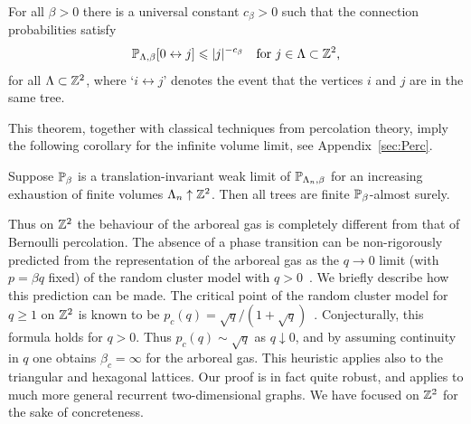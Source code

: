 \documentclass[11pt]{amsart}
\numberwithin{equation}{section}
\numberwithin{theorem}{section}
\begin{document}
\begin{theorem}
  \label{thm:Z2}
  For all $\beta>0$ there is a universal constant $c_\beta>0$ such that the
  connection probabilities satisfy
  \begin{equation}
    \label{eq:Z2}
    \P_{\Lambda,\beta}[0\leftrightarrow j] \leq |j|^{-c_\beta} \quad \text{for $j\in \Lambda \subset \Z^2$,}
  \end{equation}
  for all $\Lambda\subset\Z^2$, where
  `$i\leftrightarrow j$' denotes the event that the vertices $i$ and
  $j$ are in the same tree.
\end{theorem}

This theorem, together with classical techniques from percolation
theory, imply the following corollary for the infinite volume limit, see Appendix~\ref{sec:Perc}.
\begin{corollary}
  \label{cor:Z2}
  Suppose $\P_{\beta}$ is a translation-invariant weak limit of
  $\P_{\Lambda_{n},\beta}$ for an increasing exhaustion of finite volumes
  $\Lambda_{n}\uparrow \Z^{2}$. Then all trees are finite
  $\P_{\beta}$-almost surely.
\end{corollary}

Thus on $\Z^{2}$
the behaviour of the arboreal gas is completely different from that of
Bernoulli percolation. The absence of a phase transition can be
non-rigorously predicted from the representation of the arboreal gas
as the $q\to 0$ limit (with $p=\beta q$ fixed) of the random cluster
model with $q>0$~\cite{PhysRevLett.98.030602}. We briefly describe how
this prediction can be made. The critical point of the random cluster
model for $q\geq 1$ on $\Z^{2}$ is known to be
$p_{c}(q)=\sqrt{q}/(1+\sqrt{q})$~\cite{MR2948685}. Conjecturally, this
formula holds for $q>0$. Thus $p_{c}(q)\sim \sqrt{q}$ as
$q\downarrow 0$, and by assuming continuity in $q$ one obtains
$\beta_{c}=\infty$ for the arboreal gas. This heuristic applies
also to the triangular and hexagonal lattices. Our proof is in fact
quite robust, and applies to much more general recurrent
two-dimensional graphs. We have focused on $\Z^{2}$ for the
sake of concreteness.
\end{document}
